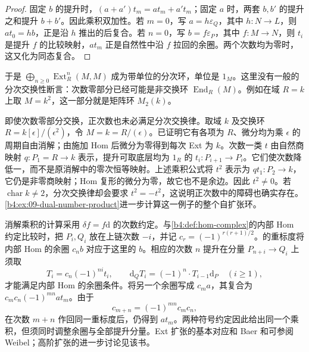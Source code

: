 \begin{proof}
	固定 \(b\) 的提升时，\((a+a')t_m=a t_m+a't_m\)；固定 \(a\) 时，两套 \(b,b'\) 的提升之和提升 \(b+b'\)。因此乘积双加性。若 \(m=0\)，写 \(a=h\varepsilon_Q\)，其中 \(h:N\to L\)，则 \(a t_0=h b\)，正是沿 \(h\) 推出的后复合。若 \(n=0\)，写 \(b=f\varepsilon_P\)，其中 \(f:M\to N\)，则 \(t_i\) 是提升 \(f\) 的比较映射，\(a t_m\) 正是自然性中沿 \(f\) 拉回的余圈。两个次数均为零时，这又化为同态复合。
\end{proof}

于是 \(\bigoplus_{n\ge0}\operatorname{Ext}_R^n(M,M)\) 成为带单位的分次环，单位是 \(1_M\)。这里没有一般的分次交换性断言：次数零部分已经可能是非交换环 \(\operatorname{End}_R(M)\)。例如在域 \(R=k\) 上取 \(M=k^2\)，这一部分就是矩阵环 \(M_2(k)\)。

\ProseParagraphBreak
即使次数零部分交换，正次数也未必满足分次交换律。取域 \(k\) 及交换环 \(R=k[\epsilon]/(\epsilon^2)\)，令 \(M=k=R/(\epsilon)\)。已证明它有各项为 \(R\)、微分均为乘 \(\epsilon\) 的周期自由消解；由施加 Hom 后微分为零得到每次 Ext 为 \(k\)。次数一类 \(t\) 由自然商映射 \(q:P_1=R\to k\) 表示，提升可取底层均为 \(1_R\) 的 \(t_i:P_{i+1}\to P_i\)。它们使次数降低一，而不是原消解中的零次恒等映射。上述乘积公式将 \(t^2\) 表示为 \(q t_1:P_2\to k\)，它仍是非零商映射；Hom 复形的微分为零，故它也不是余边。因此 \(t^2\ne0\)。若 \(\operatorname{char}k\ne2\)，分次交换律却会要求 \(t^2=-t^2\)，这说明正次数中的障碍也确实存在。\cref{b4:ex:09-dual-number-product}进一步计算这一例子的整个自扩张环。

\ProseParagraphBreak
消解乘积的计算采用 \(\delta f=f\mathrm{d}\) 的次数约定。与\cref{b4:def:hom-complex}的内部 Hom 约定比较时，把 \(P_i,Q_i\) 放在上链次数 \(-i\)，并记 \(c_r=(-1)^{r(r+1)/2}\)。的重标度将内部 Hom 的余圈 \(c_nb\) 对应于这里的 \(b\)。相应的次数 \(n\) 提升在分量 \(P_{n+i}\to Q_i\) 上须取
\[
	T_i=c_n(-1)^{ni}t_i,\qquad \mathrm{d}_QT_i=(-1)^n\cdot T_{i-1}\mathrm{d}_P\quad(i\ge1),
\]
才能满足内部 Hom 的余圈条件。将另一个余圈写成 \(c_ma\)，其复合为 \(c_mc_n(-1)^{mn}at_m\)。由于
\[
	c_{m+n}=(-1)^{mn}c_mc_n,
\]
在次数 \(m+n\) 作回同一重标度后，仍得到 \(at_m\)。两种符号约定因此给出同一个乘积，但须同时调整余圈与全部提升分量。Ext 扩张的基本对应和 Baer 和可参阅 Weibel\cite[Theorem 3.4.3, Definition 3.4.4, Corollary 3.4.5]{Weibel1994HomologicalAlgebra}；高阶扩张的进一步讨论见该书\cite[Vista 3.4.6]{Weibel1994HomologicalAlgebra}。
